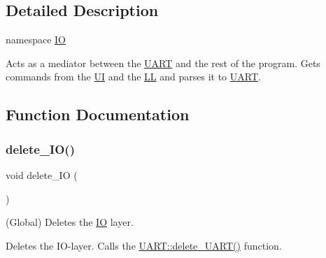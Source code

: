 \subsection{Detailed Description}
namespace \mbox{\hyperlink{namespace_i_o}{IO}} 

Acts as a mediator between the \mbox{\hyperlink{namespace_u_a_r_t}{U\+A\+RT}} and the rest of the program. Gets commands from the \mbox{\hyperlink{namespace_u_i}{UI}} and the \mbox{\hyperlink{namespace_l_l}{LL}} and parses it to \mbox{\hyperlink{namespace_u_a_r_t}{U\+A\+RT}}. 

\subsection{Function Documentation}
\mbox{\label{namespace_i_o_a71df3822c66f8b597b92e7e906a9d61f}} 
\subsubsection{\texorpdfstring{delete\+\_\+\+I\+O()}{delete\_IO()}}
{\footnotesize\ttfamily void delete\+\_\+\+IO (\begin{DoxyParamCaption}{ }\end{DoxyParamCaption})}



(Global) Deletes the \mbox{\hyperlink{namespace_i_o}{IO}} layer. 

Deletes the I\+O-\/layer. Calls the \mbox{\hyperlink{namespace_u_a_r_t_ab7d8037afb7dff98f21b6a07b3fc2158}{U\+A\+R\+T\+::delete\+\_\+\+U\+A\+R\+T()}} function.


